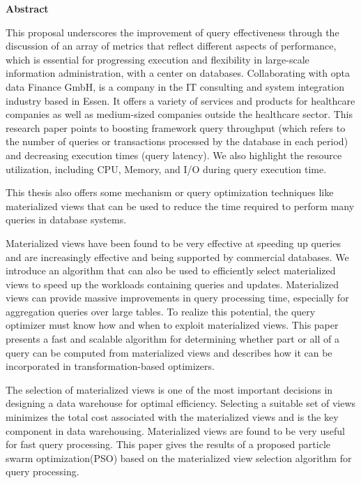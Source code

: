 \thispagestyle{empty}
\begin{center}
    \fancyhead[]{}\Large\textbf{Abstract}
\end{center}

\normalsize
This proposal underscores the improvement of query effectiveness through the discussion of an array of metrics that reflect different aspects of performance, which is essential for progressing execution and flexibility in large-scale information administration, with a center on databases. Collaborating with opta data Finance GmbH, is a company in the IT consulting and system integration industry based in Essen. It offers a variety of services and products for healthcare companies as well as medium-sized companies outside the healthcare sector. This research paper points to boosting framework query throughput (which refers to the number of queries or transactions processed by the database in each period) and decreasing execution times (query latency). We also highlight the resource utilization,  including CPU, Memory, and I/O during query execution time.\vspace{.4cm}

This thesis also offers some mechanism or query optimization techniques like materialized views that can be used to reduce the time required to perform many queries in database systems.\vspace{.4cm} 

Materialized views have been found to be very effective at speeding up queries and are increasingly effective and being supported by commercial databases. We introduce an algorithm that can also be used to efficiently select materialized views to speed up the workloads containing queries and updates. Materialized views can provide massive improvements in query processing time, especially for aggregation queries over large tables. To realize this potential, the query optimizer must know how and when to exploit materialized views. This paper presents a fast and scalable algorithm for determining whether part or all of a query can be computed from materialized views and describes how it can be incorporated in transformation-based optimizers.\vspace{.4cm}

The selection of materialized views is one of the most important decisions in designing a data warehouse for optimal efficiency. Selecting a suitable set of views minimizes the total cost associated with the materialized views and is the key component in data warehousing. Materialized views are found to be very useful for fast query processing. This paper gives the results of a proposed particle swarm optimization(PSO) based on the materialized view selection algorithm for query processing.\vspace{.4cm}



